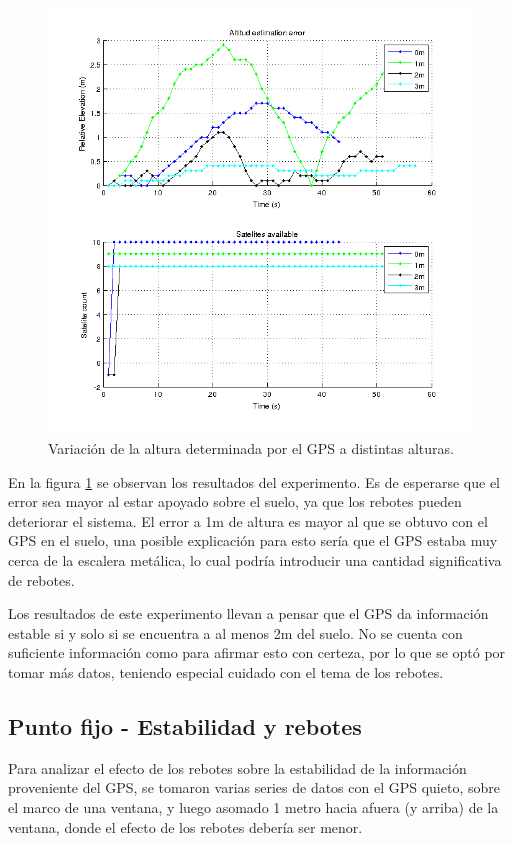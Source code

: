 \documentclass[spanish,12pt,a4paper,titlepage]{report}
\begin{document}
\begin{figure}[h!]
  \begin{center}
  \includegraphics[width=.7\textwidth]{./img/altura_punto_fijo_fing.png}
  \end{center}
  \caption{Variación de la altura determinada por el GPS a distintas alturas.}
  \label{fig:altura_punto_fijo_fing.png}
\end{figure}

En la figura \ref{fig:altura_punto_fijo_fing.png} se observan los resultados del experimento. Es de esperarse que el error sea mayor al estar apoyado sobre el suelo, ya que los rebotes pueden deteriorar el sistema. El error a 1m de altura es mayor al que se obtuvo con el GPS en el suelo, una posible explicación para esto sería que el GPS estaba muy cerca de la escalera metálica, lo cual podría introducir una cantidad significativa de rebotes.

Los resultados de este experimento llevan a pensar que el GPS da información estable si y solo si se encuentra a al menos 2m del suelo. No se cuenta con suficiente información como para afirmar esto con certeza, por lo que se optó por tomar más datos, teniendo especial cuidado con el tema de los rebotes.

\subsection{Punto fijo - Estabilidad y rebotes}
\label{sec:altura-punto-fijo-estabilidad}

Para analizar el efecto de los rebotes sobre la estabilidad de la información proveniente del GPS, se tomaron varias series de datos con el GPS quieto, sobre el marco de una ventana, y luego asomado 1 metro hacia afuera (y arriba) de la ventana, donde el efecto de los rebotes debería ser menor.
\end{document}
